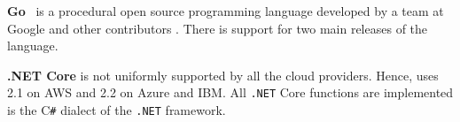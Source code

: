 \textbf{Go}~\cite{GoProject} is a procedural open source programming language developed by a team at Google and other contributors \cite{GoDoc, GoProject}. 
There is support for two main releases of the language.

\textbf{.NET Core} is not uniformly supported by all the cloud providers. 
Hence, \sys uses 2.1 on \gls{AWS} and 2.2 on Azure and \gls{IBM}.
All \texttt{.NET} Core functions are implemented is the C\texttt{\#} dialect of the \texttt{.NET} framework.

